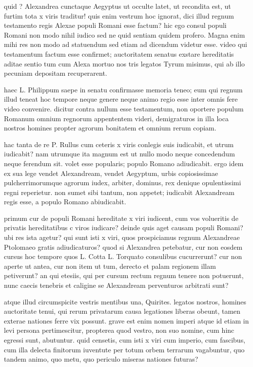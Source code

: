  quid ? Alexandrea cunctaque Aegyptus ut occulte latet, ut recondita est, ut furtim tota x viris traditur! quis enim vestrum hoc ignorat, dici illud regnum testamento regis Alexae populi Romani esse factum? hic ego consul populi Romani non modo nihil iudico sed ne quid sentiam quidem profero. Magna enim mihi res non modo ad statuendum sed etiam ad dicendum videtur esse. video qui testamentum factum esse confirmet; auctoritatem senatus exstare hereditatis aditae sentio tum cum Alexa mortuo nos tris legatos Tyrum misimus, qui ab illo pecuniam depositam recuperarent.

 haec L. Philippum saepe in senatu confirmasse memoria teneo; eum qui regnum illud teneat hoc tempore neque genere neque animo regio esse inter omnis fere video convenire. dicitur contra nullum esse testamentum, non oportere populum Romanum omnium regnorum appententem videri, demigraturos in illa loca nostros homines propter agrorum bonitatem et omnium rerum copiam.

 hac tanta de re P. Rullus cum ceteris x viris conlegis suis iudicabit, et utrum iudicabit? nam utrumque ita magnum est ut nullo modo neque concedendum neque ferendum sit. volet esse popularis; populo Romano adiudicabit. ergo idem ex sua lege vendet Alexandream, vendet Aegyptum, urbis copiosissimae pulcherrimorumque agrorum iudex, arbiter, dominus, rex denique opulentissimi regni reperietur. non sumet sibi tantum, non appetet; iudicabit Alexandream regis esse, a populo Romano abiudicabit.

 primum cur de populi Romani hereditate x viri iudicent, cum vos volueritis de privatis hereditatibus c viros iudicare? deinde quis aget causam populi Romani? ubi res ista agetur? qui sunt isti x viri, quos prospiciamus regnum Alexandreae Ptolomaeo gratis adiudicaturos? quod si Alexandrea petebatur, cur non eosdem cursus hoc tempore quos L. Cotta L. Torquato consulibus cucurrerunt? cur non aperte ut antea, cur non item ut tum, derecto et palam regionem illam petiverunt? an qui etesiis, qui per cursum rectum regnum tenere non potuerunt, nunc caecis tenebris et caligine se Alexandream perventuros arbitrati sunt?

 atque illud circumspicite vestris mentibus una, Quirites. legatos nostros, homines auctoritate tenui, qui rerum privatarum causa legationes liberas obeunt, tamen exterae nationes ferre vix possunt. grave est enim nomen imperi atque id etiam in levi persona pertimescitur, propterea quod vestro, non suo nomine, cum hinc egressi sunt, abutuntur. quid censetis, cum isti x viri cum imperio, cum fascibus, cum illa delecta finitorum iuventute per totum orbem terrarum vagabuntur, quo tandem animo, quo metu, quo periculo miseras nationes futuras?

